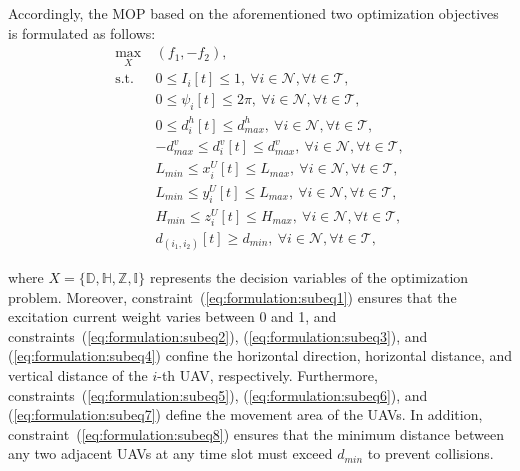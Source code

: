 \documentclass[10pt,journal,compsoc]{IEEEtran}
\begin{document}
\par Accordingly, the MOP based on the aforementioned two optimization objectives is formulated as follows:
\begin{subequations}
\label{eq:formulation}
\begin{align}
    \underset{X}{\max} \ & ( f_1, -f_2 ), \\
    \text{s.t.} \ & 0 \leq I_i[t] \leq 1, \ \forall i \in \mathcal{N}, \forall t \in \mathcal{T}, \label{eq:formulation:subeq1}\\
    & 0 \leq \psi_i[t] \leq 2 \pi, \ \forall i \in \mathcal{N}, \forall t \in \mathcal{T}, \label{eq:formulation:subeq2}\\
    & 0 \leq d^h_{i}[t] \leq d^h_{max}, \ \forall i \in \mathcal{N}, \forall t \in \mathcal{T}, \label{eq:formulation:subeq3}\\
    & -d^v_{max} \leq d_{i}^v[t] \leq d^v_{max}, \ \forall i \in \mathcal{N}, \forall t \in \mathcal{T}, \label{eq:formulation:subeq4}\\
    & L_{min} \leq x_i^U[t] \leq L_{max}, \ \forall i \in \mathcal{N}, \forall t \in \mathcal{T}, \label{eq:formulation:subeq5}\\
    & L_{min} \leq y_i^U[t] \leq L_{max}, \ \forall i \in \mathcal{N}, \forall t \in \mathcal{T}, \label{eq:formulation:subeq6}\\
    & H_{min} \leq z_i^U[t] \leq H_{max}, \ \forall i \in \mathcal{N}, \forall t \in \mathcal{T}, \label{eq:formulation:subeq7}\\
    & d_{(i_1, i_2)}[t] \geq d_{min}, \ \forall i \in \mathcal{N}, \forall t \in \mathcal{T}, \label{eq:formulation:subeq8}
\end{align}
\end{subequations}

\noindent where $X = \{\mathbb{D}, \mathbb{H}, \mathbb{Z}, \mathbb{I}\}$ represents the decision variables of the optimization problem. Moreover, constraint~(\ref{eq:formulation:subeq1}) ensures that the excitation current weight varies between 0 and 1, and constraints~(\ref{eq:formulation:subeq2}),  (\ref{eq:formulation:subeq3}), and (\ref{eq:formulation:subeq4}) confine the horizontal direction, horizontal distance, and vertical distance of the $i$-th UAV, respectively. Furthermore, constraints~(\ref{eq:formulation:subeq5}), (\ref{eq:formulation:subeq6}), and (\ref{eq:formulation:subeq7}) define the movement area of the UAVs. In addition, constraint~(\ref{eq:formulation:subeq8}) ensures that the minimum distance between any two adjacent UAVs at any time slot must exceed $d_{min}$ to prevent collisions.
\end{document}
